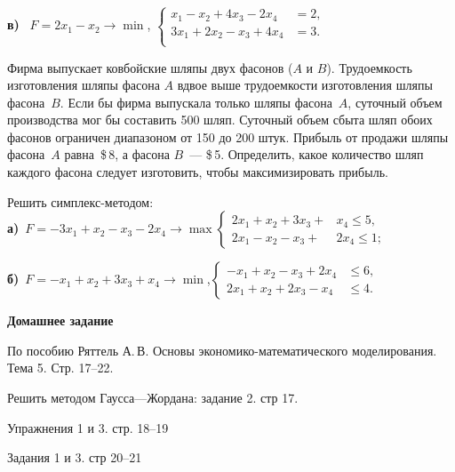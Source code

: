 \documentclass[a5paper,11pt]{extarticle}
\begin{document}
\begin{enumerate}
\textbf{в)}~%
$F=2x_{1}-x_{2} \to \min$,\quad
$
\left\lbrace
\begin{aligned}
  x_1-x_2+4x_3-2x_4&=2,\\
  3x_1+2x_2-x_3+4x_4&=3.\\
\end{aligned}
\right.
$

\item
Фирма выпускает ковбойские шляпы двух фасонов ($A$ и $B$). Трудоемкость изготовления шляпы фасона $A$ вдвое выше трудоемкости изготовления шляпы фасона~$B$. Если бы фирма выпускала только шляпы фасона~$A$, суточный объем производства мог бы составить 500 шляп. 
Суточный объем сбыта шляп обоих фасонов ограничен диапазоном от 150 до 200 штук. Прибыль от продажи шляпы фасона~$A$ равна~\$\,8, а фасона $B$~--- \$\,5. Определить, какое количество шляп каждого фасона следует изготовить, чтобы максимизировать прибыль.


  \item 
  	Решить симплекс-методом:\\
  \textbf{а)}~$F  = -3x_1 + x_2 - x_3 - 2x_4  \to \max$\quad $
  \left\lbrace\begin{aligned}
    2x_1 + x_2 + 3x_3 + &x_4 \leqslant 5,\\
    2x_1 - x_2 - x_3 + &2x_4 \leqslant 1;
  \end{aligned}\right.
  $ 
  
  \textbf{б)}~$F = -x_1 +x_2 + 3x_3 +x_4  \to \min$,\quad $
  \left\lbrace\begin{aligned}
  -x_1 + x_2 - x_3 + 2x_4 &\leqslant 6,\\
  2x_1 + x_2 + 2x_3 - x_4 &\leqslant 4.
  \end{aligned}\right.
  $

\medskip
{\item[] \centering \bfseries Домашнее задание\par}
По пособию Ряттель А.\,В. Основы экономико-математического моделирования. Тема 5. Стр. 17--22.
\item Решить методом Гаусса---Жордана: задание 2. стр 17.
\item Упражнения 1 и 3. стр. 18--19
\item Задания 1 и 3. стр 20--21


\end{enumerate}
\end{document}
